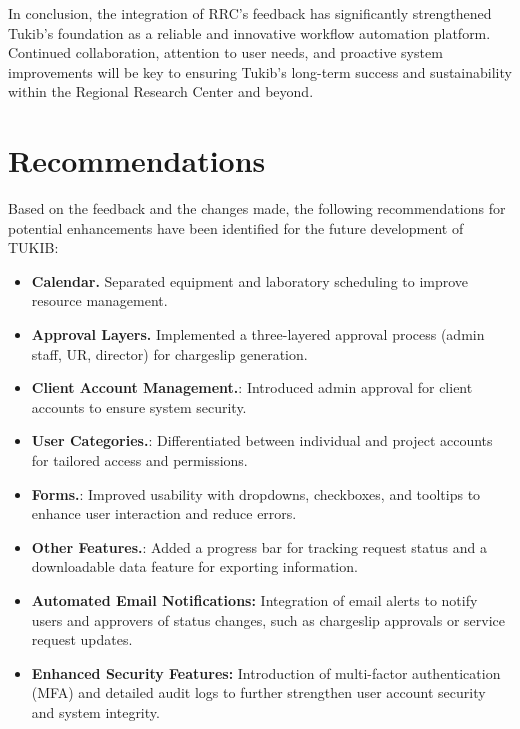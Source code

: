 In conclusion, the integration of RRC’s feedback has significantly strengthened Tukib’s foundation as a reliable and innovative workflow automation platform. Continued collaboration, attention to user needs, and proactive system improvements will be key to ensuring Tukib’s long-term success and sustainability within the Regional Research Center and beyond.

\section{Recommendations}
Based on the feedback and the changes made, the following recommendations for potential enhancements have been identified for the future development of TUKIB:


\begin{itemize}
	\item \textbf{Calendar.} Separated equipment and laboratory scheduling to improve resource management.
	\item \textbf{Approval Layers.} Implemented a three-layered approval process (admin staff, UR, director) for chargeslip generation.
	\item \textbf{Client Account Management.}: Introduced admin approval for client accounts to ensure system security.
	\item \textbf{User Categories.}: Differentiated between individual and project accounts for tailored access and permissions.
	\item \textbf{Forms.}: Improved usability with dropdowns, checkboxes, and tooltips to enhance user interaction and reduce errors.
	\item \textbf{Other Features.}: Added a progress bar for tracking request status and a downloadable data feature for exporting information.
	\item \textbf{Automated Email Notifications:} Integration of email alerts to notify users and approvers of status changes, such as chargeslip approvals or service request updates.
	\item \textbf{Enhanced Security Features:} Introduction of multi-factor authentication (MFA) and detailed audit logs to further strengthen user account security and system integrity.
\end{itemize}

